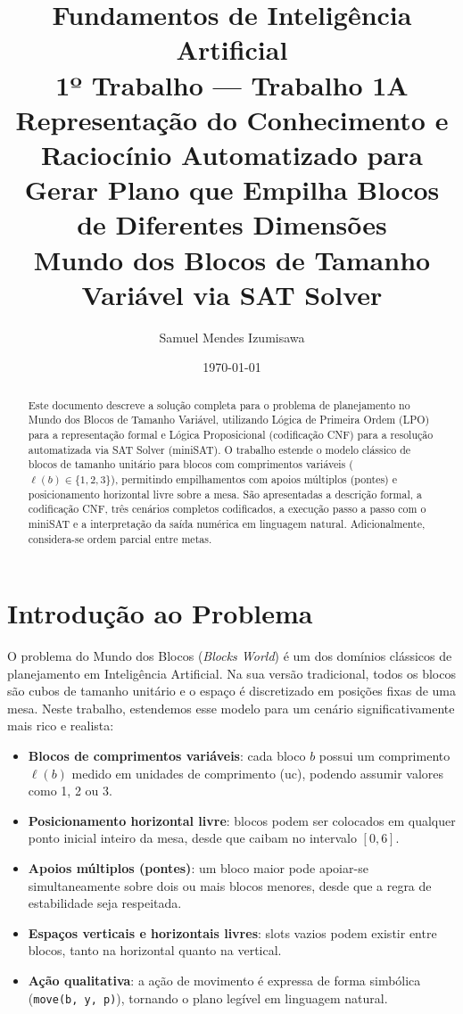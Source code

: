\documentclass[12pt,a4paper]{article}
\title{
    \vspace{-1.5cm}
    \textbf{Fundamentos de Inteligência Artificial}\\[0.3cm]
    \large 1º Trabalho — Trabalho 1A\\[0.5cm]
    \Huge \textbf{Representação do Conhecimento e Raciocínio Automatizado para Gerar Plano que Empilha Blocos de Diferentes Dimensões}\\[0.4cm]
    \large Mundo dos Blocos de Tamanho Variável via SAT Solver
}
\author{Samuel Mendes Izumisawa}
\date{\today}
\begin{document}
\maketitle
\thispagestyle{empty}

\begin{abstract}
Este documento descreve a solução completa para o problema de planejamento no Mundo dos Blocos de Tamanho Variável, utilizando Lógica de Primeira Ordem (LPO) para a representação formal e Lógica Proposicional (codificação CNF) para a resolução automatizada via SAT Solver (miniSAT). O trabalho estende o modelo clássico de blocos de tamanho unitário para blocos com comprimentos variáveis ($\ell(b) \in \{1,2,3\}$), permitindo empilhamentos com apoios múltiplos (pontes) e posicionamento horizontal livre sobre a mesa. São apresentadas a descrição formal, a codificação CNF, três cenários completos codificados, a execução passo a passo com o miniSAT e a interpretação da saída numérica em linguagem natural. Adicionalmente, considera-se ordem parcial entre metas.
\end{abstract}

\newpage
\tableofcontents
\newpage

\section{Introdução ao Problema}
\label{sec:introducao}

O problema do Mundo dos Blocos (\emph{Blocks World}) é um dos domínios clássicos de planejamento em Inteligência Artificial. Na sua versão tradicional, todos os blocos são cubos de tamanho unitário e o espaço é discretizado em posições fixas de uma mesa. Neste trabalho, estendemos esse modelo para um cenário significativamente mais rico e realista:

\begin{itemize}[leftmargin=1.2cm]
    \item \textbf{Blocos de comprimentos variáveis}: cada bloco $b$ possui um comprimento $\ell(b)$ medido em unidades de comprimento (uc), podendo assumir valores como 1, 2 ou 3.
    \item \textbf{Posicionamento horizontal livre}: blocos podem ser colocados em qualquer ponto inicial inteiro da mesa, desde que caibam no intervalo $[0,6]$.
    \item \textbf{Apoios múltiplos (pontes)}: um bloco maior pode apoiar-se simultaneamente sobre dois ou mais blocos menores, desde que a regra de estabilidade seja respeitada.
    \item \textbf{Espaços verticais e horizontais livres}: slots vazios podem existir entre blocos, tanto na horizontal quanto na vertical.
    \item \textbf{Ação qualitativa}: a ação de movimento é expressa de forma simbólica (\texttt{move(b, y, p)}), tornando o plano legível em linguagem natural.
\end{itemize}
\end{document}
